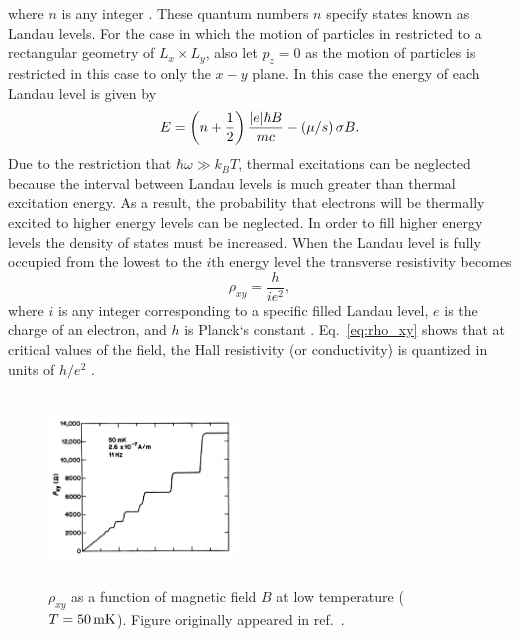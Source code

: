 where $n$ is any integer \cite{Landau_Quantum1965}. These quantum numbers $n$ specify states known as Landau levels. For the case in which the motion of particles in restricted to a rectangular geometry of $L_x \times L_y$, also let $p_z=0$ as the motion of particles is restricted in this case to only the $x-y$ plane. In this case the energy of each Landau level is given by 
\begin{equation}\label{eq:landau_levels_2D}
	E = \left(n+\frac{1}{2}\right)\frac{\abs{e}\hbar B}{mc} - \left(\mu/s\right)\sigma B.
\end{equation}
Due to the restriction that $\hbar\omega \gg k_B T$, thermal excitations can be neglected because the interval between Landau levels is much greater than thermal excitation energy. As a result, the probability that electrons will be thermally excited to higher energy levels can be neglected. In order to fill higher energy levels the density of states must be increased. When the Landau level is fully occupied from the lowest to the $i\mathrm{th}$ energy level the transverse resistivity becomes
\begin{equation}\label{eq:rho_xy}
	\rho_{xy} = \frac{h}{i e^2},
\end{equation}
where $i$ is any integer corresponding to a specific filled Landau level, $e$ is the charge of an electron, and $h$ is Planck`s constant \cite{Klitzing_PhysRevLett1980,Goerbig_2009}. Eq.~\ref{eq:rho_xy} shows that at critical values of the field, the Hall resistivity (or conductivity) is quantized in units of $h/e^2$ \cite{Kittel_IntroSolidState2005,Hook_Solid1991}. 
\begin{figure}[ht]
	\centering
	\includegraphics[height=5cm,width=5cm]{figs/future/IQHE_data_RHOxy_RHOxx}
	\caption[Example data of the Integer Quantum Hall Effect]{$\rho_{xy}$ as a function of magnetic field $B$ at low temperature ($T=50\,\mathrm{mK}$). Figure originally appeared in ref.~\cite{Paalanen_PhysRevB1982}.}
	\label{fig:IQHE_data}
\end{figure}
